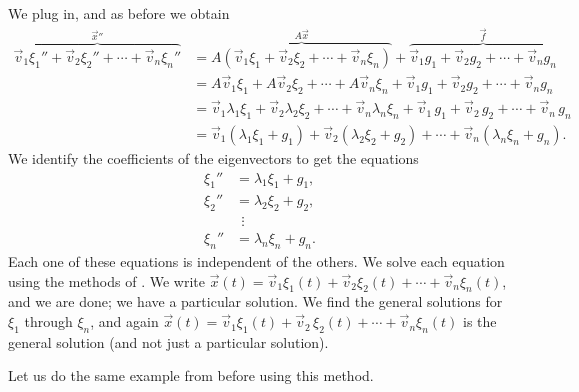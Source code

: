 \documentclass{ximera}
\begin{document}
We plug in, and as before we obtain
\begin{equation*}
    \begin{split}
        \overbrace{ \vec{v}_1 \xi_1'' + \vec{v}_2 \xi_2'' + \cdots + \vec{v}_n \xi_n'' }^{{\vec{x}}''}
        & = \overbrace{ A \left( \vec{v}_1 \xi_1 + \vec{v}_2 \xi_2 + \cdots + \vec{v}_n \xi_n \right) }^{A\vec{x}} + \overbrace{ \vec{v}_1 g_1 + \vec{v}_2 g_2 + \cdots + \vec{v}_n g_n }^{\vec{f}} \\
        & = A \vec{v}_1 \xi_1 +  A \vec{v}_2 \xi_2 + \cdots + A \vec{v}_n \xi_n + \vec{v}_1 g_1 +  \vec{v}_2 g_2 + \cdots + \vec{v}_n g_n \\
        & = \vec{v}_1 \lambda_1 \xi_1 +  \vec{v}_2 \lambda_2 \xi_2 + \cdots + \vec{v}_n \lambda_n \xi_n + \vec{v}_1 \, g_1 + \vec{v}_2 \, g_2 + \cdots + \vec{v}_n \, g_n \\
        & = \vec{v}_1 ( \lambda_1 \xi_1 + g_1 ) + \vec{v}_2 ( \lambda_2 \xi_2 + g_2 ) + \cdots + \vec{v}_n ( \lambda_n \xi_n + g_n ) .
    \end{split}
\end{equation*}
We identify the coefficients of the eigenvectors to get the equations
\begin{align*}
    \xi_1'' & = \lambda_1 \xi_1 + g_1 , \\
    \xi_2'' & = \lambda_2 \xi_2 + g_2 , \\
    & ~~ \vdots \\
    \xi_n'' & = \lambda_n \xi_n + g_n .
\end{align*}
Each one of these equations is independent of the others. We solve each equation using the methods of . We write
$\vec{x}(t) = \vec{v}_1 \xi_1(t) + \vec{v}_2 \xi_2(t) + \cdots + \vec{v}_n \xi_n(t)$, 
and we are done; we have a particular solution. We find the general solutions for $\xi_1$ through $\xi_n$, and again
$\vec{x}(t) = \vec{v}_1 \xi_1(t) + \vec{v}_2 \, \xi_2(t) + \cdots + \vec{v}_n \xi_n(t)$ is the general solution (and not just a particular solution).

\begin{example}
    Let us do the same example from before using this method.
\end{example}
\end{document}
